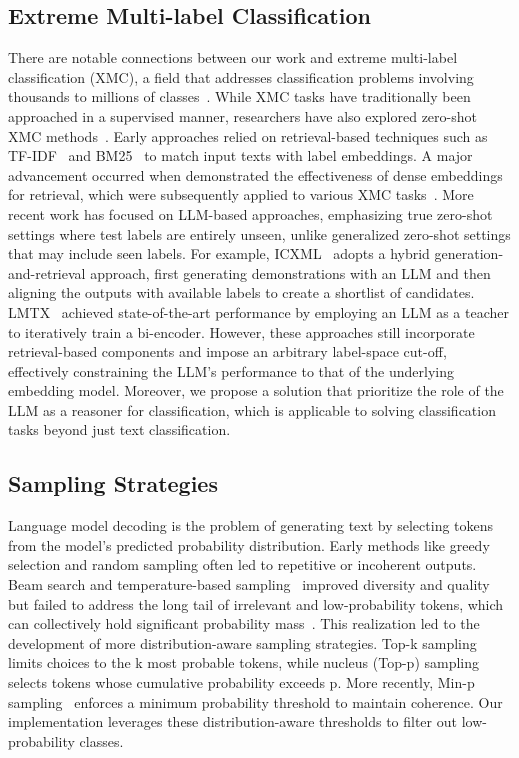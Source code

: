 \subsection{Extreme Multi-label Classification}
There are notable connections between our work and extreme multi-label classification (XMC), a field that addresses classification problems involving thousands to millions of classes~\cite{bhatia2015,mittal_multi-modal_2022,zhu2024icxmlincontextlearningframework}. While XMC tasks have traditionally been approached in a supervised manner, researchers have also explored zero-shot XMC methods~\cite{chang2020taming}. Early approaches relied on retrieval-based techniques such as TF-IDF~\cite{salton1988term} and BM25~\cite{robertson2009probabilistic} to match input texts with label embeddings. A major advancement occurred when \citet{reimers2019sentence} demonstrated the effectiveness of dense embeddings for retrieval, which were subsequently applied to various XMC tasks~\cite{you2019attentionxml,chang2020taming,jiang2021lightxml}. More recent work has focused on LLM-based approaches, emphasizing true zero-shot settings where test labels are entirely unseen, unlike generalized zero-shot settings that may include seen labels. For example, ICXML~\cite{zhu2024icxmlincontextlearningframework} adopts a hybrid generation-and-retrieval approach, first generating demonstrations with an LLM and then aligning the outputs with available labels to create a shortlist of candidates. LMTX~\cite{Zhang2024ZeroShotLO} achieved state-of-the-art performance by employing an LLM as a teacher to iteratively train a bi-encoder. However, these approaches still incorporate retrieval-based components and impose an arbitrary label-space cut-off, effectively constraining the LLM’s performance to that of the underlying embedding model. Moreover, we propose a solution that prioritize the role of the LLM as a reasoner for classification, which is applicable to solving classification tasks beyond just text classification. 

\subsection{Sampling Strategies}
Language model decoding is the problem of generating text by selecting tokens from the model’s predicted probability distribution. Early methods like greedy selection and random sampling often led to repetitive or incoherent outputs. Beam search and temperature-based sampling~\cite{temperature2017} improved diversity and quality but failed to address the long tail of irrelevant and low-probability tokens, which can collectively hold significant probability mass~\cite{Holtzman2020The}.
This realization led to the development of more distribution-aware sampling strategies. Top-k sampling~\cite{fan2018hierarchicalneuralstorygeneration} limits choices to the k most probable tokens, while nucleus (Top-p) sampling~\cite{Holtzman2020The} selects tokens whose cumulative probability exceeds p. More recently, Min-p sampling~\cite{nguyen2024turningheatminpsampling} enforces a minimum probability threshold to maintain coherence. Our implementation leverages these distribution-aware thresholds to filter out low-probability classes.